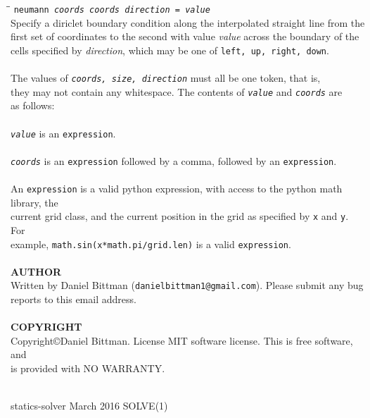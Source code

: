 \begin{tabbing}
\hspace{30pt}\=\hspace{30pt}\=\kill
	\> \texttt{neumann \textit{coords} \textit{coords} \textit{direction} = \textit{value}}\\
	\> \> Specify a diriclet boundary condition along the interpolated straight line from the\\
	\> \> first set of coordinates to the second with value \textit{value} across the boundary of the\\
	\> \> cells specified by \textit{direction}, which may be one of \texttt{left, up, right, down}.\\
	\\
	\> The values of \texttt{\textit{coords, size, direction}} must all be one token, that is,\\
	\> they may not contain any whitespace. The contents of \texttt{\textit{value}} and \texttt{\textit{coords}} are\\
	\> as follows:\\
	\\
	\> \texttt{\textit{value}} is an \texttt{expression}.\\
	\\
	\> \texttt{\textit{coords}} is an \texttt{expression} followed by a comma, followed by an \texttt{expression}.\\
	\\
	An \texttt{expression} is a valid python expression, with access to the python math library, the\\
	current grid class, and the current position in the grid as specified by \texttt{x} and \texttt{y}. For \\
	example, \texttt{math.sin(x*math.pi/grid.len)} is a valid \texttt{expression}.\\
	\\
	\textbf{AUTHOR}\\
	\> Written by Daniel Bittman (\texttt{danielbittman1@gmail.com}). Please submit any bug\\
	\> reports to this email address.\\
	\\
	\textbf{COPYRIGHT}\\
	\> Copyright\copyright Daniel Bittman. License MIT software license. This is free software, and\\
	\> is provided with NO WARRANTY.\\
	\\

\end{tabbing}
\begin{flushleft}
	statics-solver
	\hfill March 2016 \hfill
	SOLVE(1)
\end{flushleft}

